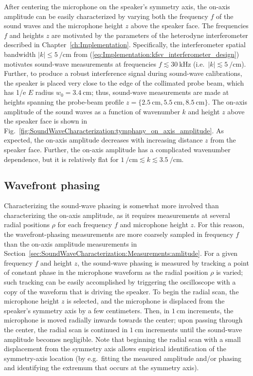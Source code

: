 \label{sec:SoundWaveCharacterization:Measurements:amlitude}
After centering the microphone on the speaker's symmetry axis,
the on-axis amplitude can be easily characterized by
varying both the frequency $f$ of the sound waves and
the microphone height $z$ above the speaker face.
The frequencies $f$ and heights $z$
are motivated by the parameters of the heterodyne interferometer
described in Chapter~\ref{ch:Implementation}.
Specifically, the interferometer spatial bandwidth
$|k| \leq \SI{5}{\per\centi\meter}$
from (\ref{eq:Implementation:kfsv_interferometer_design}) motivates
sound-wave measurements at frequencies
$f \lesssim \SI{30}{\kilo\hertz}$
(i.e.\ $|k| \lesssim \SI{5}{\per\centi\meter}$).
Further, to produce a robust interference signal
during sound-wave calibrations,
the speaker is placed very close
to the edge of the collimated probe beam,
which has 1/e $E$ radius $w_0 = \SI{3.4}{\centi\meter}$;
thus, sound-wave measurements are made at heights
spanning the probe-beam profile
$z
=
\{\SI{2.5}{\centi\meter}, \SI{5.5}{\centi\meter}, \SI{8.5}{\centi\meter}\}$.
The on-axis amplitude of the sound waves as a function of
wavenumber $k$ and height $z$ above the speaker face is shown in
Fig.~\ref{fig:SoundWaveCharacterization:tymphany_on_axis_amplitude}.
As expected, the on-axis amplitude decreases with
increasing distance $z$ from the speaker face.
Further, the on-axis amplitude has a complicated wavenumber dependence, but
it is relatively flat for
$\SI{1}{\per\centi\meter} \lesssim k \lesssim \SI{3.5}{\per\centi\meter}$.


\subsection{Wavefront phasing}
\label{sec:SoundWaveCharacterization:Measurements:phasing}
Characterizing the sound-wave phasing is somewhat more involved
than characterizing the on-axis amplitude,
as it requires measurements at several radial positions $\rho$
for each frequency $f$ and microphone height $z$.
For this reason, the wavefront-phasing measurements
are more coarsely sampled in frequency $f$
than the on-axis amplitude measurements in
Section~\ref{sec:SoundWaveCharacterization:Measurements:amlitude}.
For a given frequency $f$ and height $z$,
the sound-wave phasing is measured by
tracking a point of constant phase in the microphone waveform
as the radial position $\rho$ is varied;
such tracking can be easily accomplished
by triggering the oscilloscope
with a copy of the waveform that is driving the speaker.
To begin the radial scan,
the microphone height $z$ is selected, and
the microphone is displaced from the speaker's symmetry axis
by a few centimeters.
Then, in $\SI{1}{\centi\meter}$ increments,
the microphone is moved radially inwards towards the center;
upon passing through the center,
the radial scan is continued in $\SI{1}{\centi\meter}$ increments
until the sound-wave amplitude becomes negligible.
Note that beginning the radial scan
with a small displacement from the symmetry axis
allows empirical identification of the symmetry-axis location
(by e.g.\ fitting the measured amplitude and/or phasing
and identifying the extremum that occurs at the symmetry axis).

